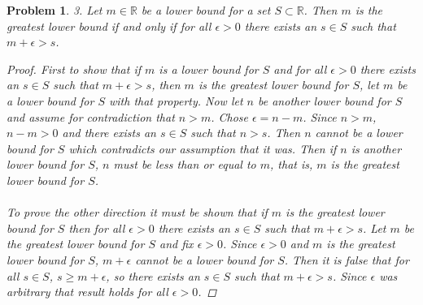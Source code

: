 \documentclass{article}
\newtheorem*{Problem}{Problem}
\begin{document}
\begin{Problem}
    3. Let $m\in \mathbb{R}$ be a lower bound for a set $S\subset \mathbb{R}$.  Then $m$ is the greatest lower bound if and only if for all $\epsilon >0$ there exists an $s\in S$ such that $m+\epsilon>s$.
    \begin{proof}
    First to show that if $m$ is a lower bound for $S$ and for all $\epsilon >0$ there exists an $s\in S$ such that $m+\epsilon>s$, then $m$ is the greatest lower bound for $S$, let $m$ be a lower bound for $S$ with that property.  Now let $n$ be another lower bound for $S$ and assume for contradiction that $n>m$.  Chose $\epsilon =n-m$.  Since $n>m$, $n-m>0$ and there exists an $s\in S$ such that $n>s$.  Then $n$ cannot be a lower bound for $S$ which contradicts our assumption that it was.  Then if $n$ is another lower bound for $S$, $n$ must be less than or equal to $m$, that is, $m$ is the greatest lower bound for $S$. \\ \\
    To prove the other direction it must be shown that if $m$ is the greatest lower bound for $S$ then for all $\epsilon > 0$ there exists an $s\in S$ such that $m+\epsilon >s$.  Let $m$ be the greatest lower bound for $S$ and fix $\epsilon >0$.  Since $\epsilon>0$ and $m$ is the greatest lower bound for $S$, $m+\epsilon$ cannot be a lower bound for $S$.  Then it is false that for all $s\in S$, $s\geq m+\epsilon$, so there exists an $s\in S$ such that $m+\epsilon >s$.  Since $\epsilon$ was arbitrary that result holds for all $\epsilon >0$.
    \end{proof}
\end{Problem}
\end{document}
